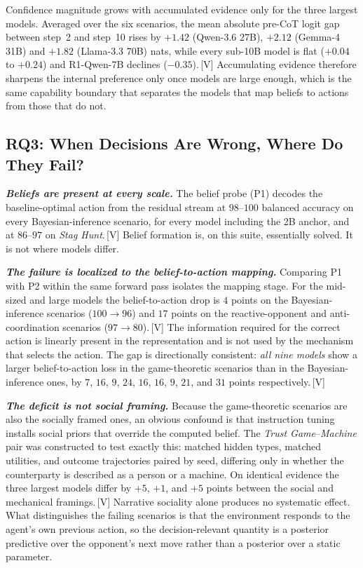 Confidence magnitude grows with accumulated evidence only for the three largest
models. Averaged over the six scenarios, the mean absolute pre-CoT logit gap
between step~2 and step~10 rises by $+1.42$ (Qwen-3.6 27B), $+2.12$ (Gemma-4
31B) and $+1.82$ (Llama-3.3 70B) nats, while every sub-10B model is flat
($+0.04$ to $+0.24$) and R1-Qwen-7B declines ($-0.35$).\,[V] Accumulating
evidence therefore sharpens the internal preference only once models are large
enough, which is the same capability boundary that separates the models that
map beliefs to actions from those that do not.

\subsection{RQ3: When Decisions Are Wrong, Where Do They Fail?}

\textbf{\textit{Beliefs are present at every scale.}}
The belief probe (P1) decodes the baseline-optimal action from the residual
stream at $98$--$100$ balanced accuracy on every Bayesian-inference scenario,
for every model including the 2B anchor, and at $86$--$97$ on \textit{Stag
Hunt}.\,[V] Belief formation is, on this suite, essentially solved. It is not
where models differ.

\textbf{\textit{The failure is localized to the belief-to-action mapping.}}
Comparing P1 with P2 within the same forward pass isolates the mapping stage.
For the mid-sized and large models the belief-to-action drop is $4$ points on
the Bayesian-inference scenarios ($100\rightarrow96$) and $17$ points on the
reactive-opponent and anti-coordination scenarios ($97\rightarrow80$).\,[V]
The information required for the correct action is linearly present in the
representation and is not used by the mechanism that selects the action. The
gap is directionally consistent: \emph{all nine models} show a larger
belief-to-action loss in the game-theoretic scenarios than in the
Bayesian-inference ones, by $7$, $16$, $9$, $24$, $16$, $16$, $9$, $21$, and
$31$ points respectively.\,[V]

\textbf{\textit{The deficit is not social framing.}}
Because the game-theoretic scenarios are also the socially framed ones, an
obvious confound is that instruction tuning installs social priors that
override the computed belief. The \textit{Trust Game}--\textit{Machine} pair
was constructed to test exactly this: matched hidden types, matched utilities,
and outcome trajectories paired by seed, differing only in whether the
counterparty is described as a person or a machine. On identical evidence the
three largest models differ by $+5$, $+1$, and $+5$ points between the social
and mechanical framings.\,[V] Narrative sociality alone produces no
systematic effect. What distinguishes the failing scenarios is that the
environment responds to the agent's own previous action, so the decision-relevant
quantity is a posterior predictive over the opponent's next move rather than a
posterior over a static parameter.

